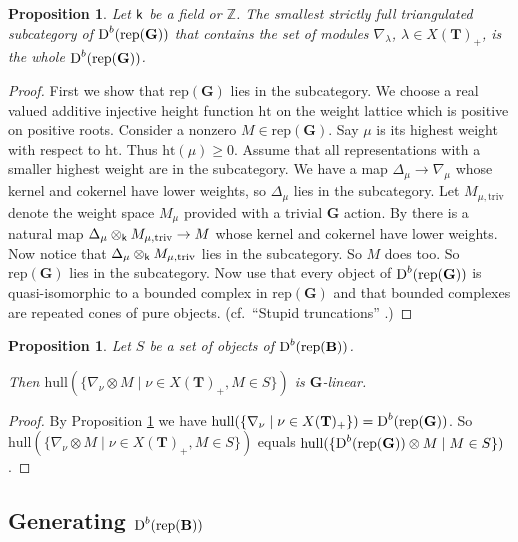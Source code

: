 \documentclass[sn-mathphys-num]{sn-jnl}%
\newcommand{\rep}{{\mathrm{rep}}}
\newcommand{\hgt}{{\mathrm {ht}}}
\newcommand{\hull}{{\mathrm{hull}}}
\newcommand*{\Dd}{\mathop{\mathrm D\kern0pt}\nolimits}
\newcommand{\sk}{{\sf k}}
\newcommand{\Z}{{\mathbb Z}}
\newcommand{\bg}{\mathbf G}
\newcommand{\fb}{\mathbf B}
\newcommand{\bt}{\mathbf T}
\newtheorem{proposition}[theorem]{Proposition}
\theoremstyle{definition}
\begin{document}
\begin{proposition}\label{prop:stronggeneratingrepG}Let $\sk$ be a field or $\Z$.
The smallest strictly full triangulated subcategory of $\Dd^b (\rep ( \bg))$ that contains the set of modules $\nabla _{\lambda}$,
$\lambda \in X(\bt)_+$, is the whole $\Dd^b (\rep ( \bg))$.
\end{proposition}

\begin{proof}First we show that $\rep(\bg)$ lies in the subcategory.
We choose a real valued additive injective height function $\hgt$ on the weight lattice which is positive on positive roots.
Consider a nonzero $M\in\rep( \bg)$. Say $\mu$ is its highest weight with respect to $\hgt$. 
Thus $\hgt(\mu)\geq0$. Assume that all representations with a smaller highest weight are in the subcategory. We have a map $\Delta_\mu\to \nabla_\mu$ whose kernel and cokernel have
lower weights, so  $\Delta_\mu$ lies in the subcategory.
Let $M_{\mu,\mathrm {triv}}$ denote the weight space $M_{\mu}$ provided with a trivial $ \bg$ action.
By \cite[Proposition 21]{FvdK} there is a natural map 
$\Delta_\mu\otimes_\sk M_{\mu,\mathrm {triv}}\to M$ whose kernel and cokernel have lower weights.  
Now notice that $\Delta_\mu\otimes_\sk M_{\mu,\mathrm {triv}}$ lies in the subcategory. So $M$ does too.
So $\rep(\bg)$ lies in the subcategory. 
Now use that every object of $\Dd^b(\rep(\bg))$  is quasi-isomorphic to a bounded complex in $\rep( \bg)$ and that bounded complexes are repeated cones of pure objects. (cf.\ ``Stupid  truncations'' \cite[2.5]{Kuzbasech}.) 
\end{proof}

\begin{proposition}\label{prop:G linear hull}
Let $S$ be a set of objects of $\Dd^b(\rep(\fb))$. 

Then $\hull(\{\nabla_\nu\otimes M\mid \nu\in X( \bt)_+,M\in S\})$ is $\bg$-linear.
\end{proposition}
\begin{proof}
By Proposition \ref{prop:stronggeneratingrepG} we have $\hull(\{\nabla_\nu\mid \nu\in X( \bt)_+\})= \Dd^b (\rep ( \bg))$. 
So $\hull(\{\nabla_\nu\otimes M\mid \nu\in X( \bt)_+,M\in S\})$ equals $\hull(\{\Dd^b (\rep ( \bg))\otimes M\mid M\in S\})$.
\end{proof}
\subsection{Generating $\Dd^b (\rep ({\fb}))$}\label{subsec:D^brepB-generation}
\end{document}
